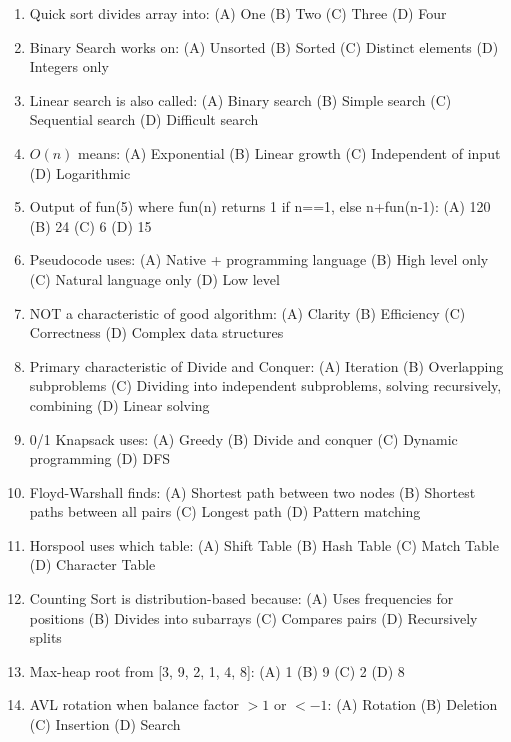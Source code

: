 \documentclass[11pt,a4paper]{article}
\begin{document}
\begin{enumerate}
\item Quick sort divides array into: (A) One (B) Two (C) Three (D) Four

\item Binary Search works on: (A) Unsorted (B) Sorted (C) Distinct elements (D) Integers only

\item Linear search is also called: (A) Binary search (B) Simple search (C) Sequential search (D) Difficult search

\item $O(n)$ means: (A) Exponential (B) Linear growth (C) Independent of input (D) Logarithmic

\item Output of fun(5) where fun(n) returns 1 if n==1, else n+fun(n-1): (A) 120 (B) 24 (C) 6 (D) 15

\item Pseudocode uses: (A) Native + programming language (B) High level only (C) Natural language only (D) Low level

\item NOT a characteristic of good algorithm: (A) Clarity (B) Efficiency (C) Correctness (D) Complex data structures

\item Primary characteristic of Divide and Conquer: (A) Iteration (B) Overlapping subproblems (C) Dividing into independent subproblems, solving recursively, combining (D) Linear solving

\item 0/1 Knapsack uses: (A) Greedy (B) Divide and conquer (C) Dynamic programming (D) DFS

\item Floyd-Warshall finds: (A) Shortest path between two nodes (B) Shortest paths between all pairs (C) Longest path (D) Pattern matching

\item Horspool uses which table: (A) Shift Table (B) Hash Table (C) Match Table (D) Character Table

\item Counting Sort is distribution-based because: (A) Uses frequencies for positions (B) Divides into subarrays (C) Compares pairs (D) Recursively splits

\item Max-heap root from [3, 9, 2, 1, 4, 8]: (A) 1 (B) 9 (C) 2 (D) 8

\item AVL rotation when balance factor $>1$ or $<-1$: (A) Rotation (B) Deletion (C) Insertion (D) Search


\end{enumerate}
\end{document}
